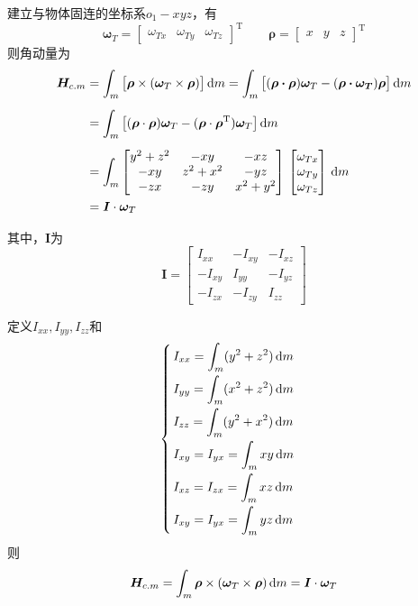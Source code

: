 建立与物体固连的坐标系$o_1 - xyz$，有
\begin{equation*}
	\bm{\omega}_T = 
	\begin{bmatrix}
		\omega_{Tx} & \omega_{Ty} & \omega_{Tz}
	\end{bmatrix}^{\text{T}} \qquad \bm{\rho} = 
\begin{bmatrix}
	x & y & z
\end{bmatrix}^{\text{T}}
\end{equation*}
则角动量为
\begin{align*}
	\bm{H}_{c.m} & = \int_m \big[\bm{\rho} \times (\bm{\omega}_T \times \bm{\rho})\big]\, {\rm{d}} m 
	= \int_m \big[(\bm{\rho \cdot \bm{\rho}}) \bm{\omega}_T - (\bm{\rho \cdot \bm{\omega_T}})\bm{\rho }\big]\, {\rm{d}} m\\[0.5em]
	& = \int_m \big[(\bm{\rho}\cdot \bm{\rho})\bm{\omega}_T - (\bm{\rho} \cdot \bm{\rho}^{\text{T}})\bm{\omega}_T\big]\, {\rm{d}} m\\[0.5em]
	& = \int_m 
	\begin{bmatrix}
		y^2 + z^2 & -xy & -xz \\
		-xy & z^2 + x^2 & -yz \\
		-zx & -zy & x^2 + y^2 
	\end{bmatrix}
	\,
	\begin{bmatrix}
		\omega_{Tx}\\
		\omega_{Ty}\\
		\omega_{Tz}
	\end{bmatrix}
	\, {\rm{d}} m\\
	& =  \bm{I}\cdot \bm{\omega}_T
\end{align*}

其中，$\bm{I}$为
\begin{equation}
	\bm{I} = 
	\begin{bmatrix}
		I_{xx} & - I_{xy} & -I_{xz} \\
		-I_{xy} & I_{yy} & -I_{yz} \\
		-I_{zx} & -I_{zy} & I_{zz}
	\end{bmatrix}
\end{equation}

定义$I_{xx},I_{yy},I_{zz}$和
\begin{equation}
	\begin{cases}
		\, \displaystyle I_{xx} = \int_m(y^2 + z^2)\, {\rm{d}} m \\[0.8em]
		\, \displaystyle I_{yy} = \int_m(x^2 + z^2)\, {\rm{d}} m \\[0.8em]
		\,  \displaystyle I_{zz} = \int_m(y^2 + x^2)\, {\rm{d}} m \\[0.8em]
		\,  \displaystyle I_{xy} = I_{yx} = \int_m xy \, {\rm{d}} m\\[0.8em]
		\,  \displaystyle I_{xz} = I_{zx} = \int_m xz \, {\rm{d}} m\\[0.8em]
		\,  \displaystyle I_{xy} = I_{yx} = \int_m yz \, {\rm{d}} m
	\end{cases}
\end{equation}
则
\begin{equation}
	\bm{H}_{c.m} = \int_m \bm{\rho} \times (\bm{\omega}_T \times \bm{\rho})\, {\rm{d}} m =  \bm{I}\cdot \bm{\omega}_T 
	\label{角动量}
\end{equation}


